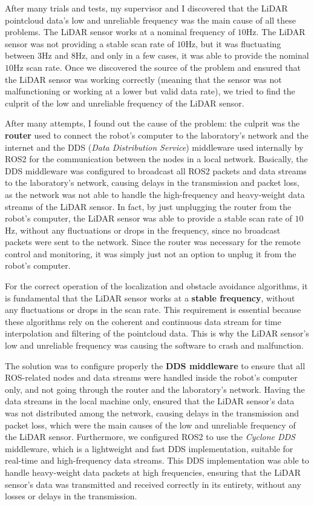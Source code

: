 After many trials and tests, my supervisor and I discovered that the LiDAR pointcloud data's low and unreliable frequency
was the main cause of all these problems. The LiDAR sensor works at a nominal frequency of $10$Hz. 
The LiDAR sensor was not providing a stable scan rate of $10$Hz, but it was fluctuating between $3$Hz and $8$Hz, 
and only in a few cases, it was able to provide the nominal $10$Hz scan rate.
Once we discovered the source of the problem and ensured that the LiDAR sensor was working correctly
(meaning that the sensor was not malfunctioning or working at a lower but valid data rate), 
we tried to find the culprit of the low and unreliable frequency of the LiDAR sensor.

After many attempts, I found out the cause of the problem: the culprit was the \textbf{router}
used to connect the robot's computer
to the laboratory's network and the internet and the DDS (\textit{Data Distribution Service}) middleware used 
internally by ROS2 for the communication between the nodes in a local network. Basically, the DDS middleware
was configured to broadcast all ROS2 packets and data streams to the laboratory's network, causing delays in the transmission
and packet loss, as the network was not able to handle the high-frequency and heavy-weight data streams of the LiDAR sensor.
In fact, by just unplugging the router from the robot's computer, the LiDAR sensor was able to provide a stable scan rate
of $10$Hz, without any fluctuations or drops in the frequency, since no broadcast packets were sent to the network.
Since the router was necessary for the remote control and monitoring, it was simply just not an option
to unplug it from the robot's computer.

For the correct operation of the localization and obstacle 
avoidance algorithms, it is fundamental that the LiDAR sensor works at a \textbf{stable frequency}, 
without any fluctuations or drops in the scan rate. This requirement is essential because these algorithms rely on the
coherent and continuous data stream for time interpolation and filtering of the pointcloud data.
This is why the LiDAR sensor's low and unreliable frequency was causing the software to crash and malfunction.

The solution was to configure properly the \textbf{DDS middleware} to ensure that all ROS-related nodes and data streams
were handled inside the robot's computer only, and not going through the router and the laboratory's network.
Having the data streams in the local machine only, ensured that the LiDAR sensor's data was not distributed 
among the network, causing delays in the transmission and packet loss, which were the main causes of the low and unreliable
frequency of the LiDAR sensor. Furthermore, we configured ROS2 to use the \textit{Cyclone DDS} middleware, which is a lightweight
and fast DDS implementation, suitable for real-time and high-frequency data streams. This DDS implementation was able to handle
heavy-weight data packets at high frequencies, ensuring that the LiDAR sensor's data was transmitted and received correctly
in its entirety, without any losses or delays in the transmission.

